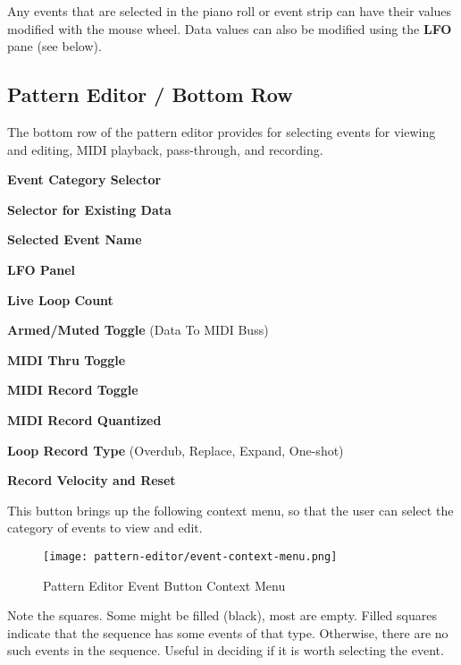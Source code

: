    Any events that are selected in the piano roll or event strip can have
   their values modified with the mouse wheel.
   Data values can also be modified using the \textbf{LFO} pane (see below).

\subsection{Pattern Editor / Bottom Row}
\label{subsec:pattern_editor_bottom}

   The bottom row of the pattern editor provides for
   selecting events for viewing and editing, MIDI playback,
   pass-through, and recording.

   \begin{enumber}
      \item \textbf{Event Category Selector}
      \item \textbf{Selector for Existing Data}
      \item \textbf{Selected Event Name}
      \item \textbf{LFO Panel}
      \item \textbf{Live Loop Count}
      \item \textbf{Armed/Muted Toggle} (Data To MIDI Buss)
      \item \textbf{MIDI Thru Toggle}
      \item \textbf{MIDI Record Toggle}
      \item \textbf{MIDI Record Quantized}
      \item \textbf{Loop Record Type} (Overdub, Replace, Expand, One-shot)
      \item \textbf{Record Velocity and Reset}
   \end{enumber}

   \setcounter{ItemCounter}{0}      %

   This button brings up the following context menu, so that the user can
   select the category of events to view and edit.

\begin{figure}[H]
   \centering 
   \texttt{[image: pattern-editor/event-context-menu.png]}
   \caption{Pattern Editor Event Button Context Menu}
   \label{fig:pattern_editor_bottom_event_context_menu}
\end{figure}

   Note the squares.  Some might be filled (black), most are empty.
   Filled squares indicate that the sequence has some events of that type.
   Otherwise, there are no such events in the sequence.
   Useful in deciding if it is worth selecting the event.

